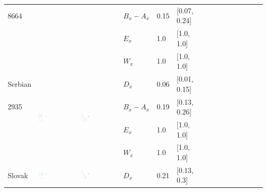 \documentclass[11pt,letterpaper]{article}
\begin{document}
\begin{longtable}{lllllllllllllll}
8664  &    &    &  $B_x-A_x$  &  0.15  &  [0.07, 0.24]  \\ 
  &    &    &  $E_x$  &  1.0  &  [1.0, 1.0]  \\ 
  &    &    &  $W_x$  &  1.0  &  [1.0, 1.0]  \\ [10.25ex] \hline
Serbian  &  \multirow{4}{*}{\includegraphics[width=0.25\textwidth]{figures/Serbian-entropy-memory.pdf}}  &  \multirow{4}{*}{\includegraphics[width=0.25\textwidth]{figures/Serbian-listener-surprisal-memory.pdf}}  &  $D_x$  &  0.06  &  [0.01, 0.15]  \\ 
2935  &    &    &  $B_x-A_x$  &  0.19  &  [0.13, 0.26]  \\ 
  &    &    &  $E_x$  &  1.0  &  [1.0, 1.0]  \\ 
  &    &    &  $W_x$  &  1.0  &  [1.0, 1.0]  \\ [10.25ex] \hline
Slovak  &  \multirow{4}{*}{\includegraphics[width=0.25\textwidth]{figures/Slovak-entropy-memory.pdf}}  &  \multirow{4}{*}{\includegraphics[width=0.25\textwidth]{figures/Slovak-listener-surprisal-memory.pdf}}  &  $D_x$  &  0.21  &  [0.13, 0.3]  \\ 

\end{longtable}
\end{document}
